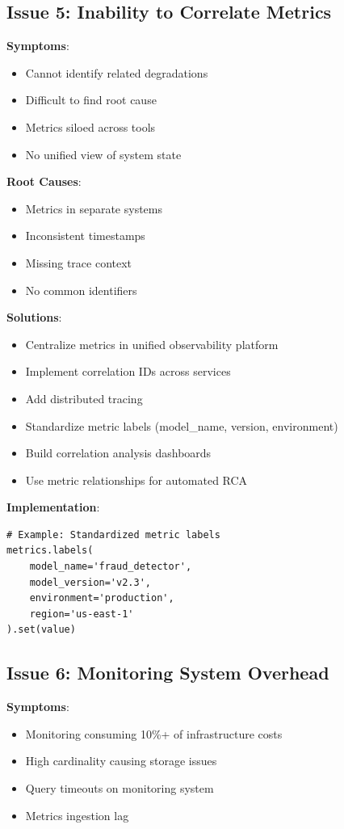 \subsection{Issue 5: Inability to Correlate Metrics}

\textbf{Symptoms}:
\begin{itemize}
    \item Cannot identify related degradations
    \item Difficult to find root cause
    \item Metrics siloed across tools
    \item No unified view of system state
\end{itemize}

\textbf{Root Causes}:
\begin{itemize}
    \item Metrics in separate systems
    \item Inconsistent timestamps
    \item Missing trace context
    \item No common identifiers
\end{itemize}

\textbf{Solutions}:
\begin{itemize}
    \item Centralize metrics in unified observability platform
    \item Implement correlation IDs across services
    \item Add distributed tracing
    \item Standardize metric labels (model\_name, version, environment)
    \item Build correlation analysis dashboards
    \item Use metric relationships for automated RCA
\end{itemize}

\textbf{Implementation}:
\begin{lstlisting}[style=python]
# Example: Standardized metric labels
metrics.labels(
    model_name='fraud_detector',
    model_version='v2.3',
    environment='production',
    region='us-east-1'
).set(value)
\end{lstlisting}

\subsection{Issue 6: Monitoring System Overhead}

\textbf{Symptoms}:
\begin{itemize}
    \item Monitoring consuming 10\%+ of infrastructure costs
    \item High cardinality causing storage issues
    \item Query timeouts on monitoring system
    \item Metrics ingestion lag
\end{itemize}

